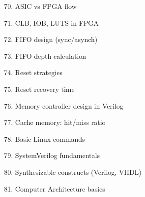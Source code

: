 \documentclass[main.tex]{subfiles}
\begin{document}
\begin{enumerate}
    \setcounter{enumi}{69}
    \item ASIC vs FPGA flow
    \item CLB, IOB, LUTS in FPGA
    \item FIFO design (sync/asynch) \cite{GT_async_fifo} \cite{GT_sync_fifo}
    \item FIFO depth calculation
    \item Reset strategies
    \item Reset recovery time
    \item Memory controller design in Verilog
    \item Cache memory: hit/miss ratio
    \item Basic Linux commands
    \item SystemVerilog fundamentals
    \item Synthesizable constructs (Verilog, VHDL)
    \item Computer Architecture basics
\end{enumerate}
\end{document}
